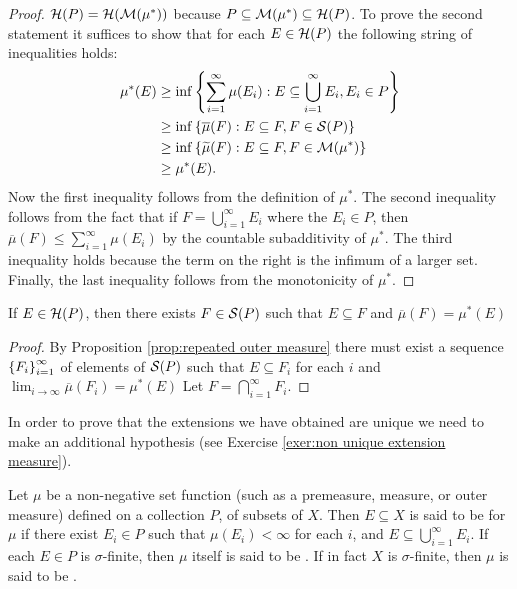 \begin{proof}

${\cal H}(P)={\cal H}({\cal M}(\mu^*))$ because $P \subseteq {\cal M}(\mu^*) \subseteq {\cal H}(P)$. To prove the second statement it suffices to show that for each $E \in {\cal H}(P)$ the following string of inequalities holds:
\begin{align*}
    \mu^*(E) &\geq \inf\left\{\sum_{i=1}^\infty\mu(E_i):E\subseteq \bigcup_{i=1}^\infty E_i, E_i \in P\right\}\\
    &\geq \inf \left\{\overline{\mu}(F):E\subseteq F,F\in {\cal S}(P)\right\}\\
    &\geq \inf \left\{\widetilde{\mu}(F):E\subseteq F,F\in {\cal M}(\mu^*)\right\}\\
    &\geq \mu^*(E).
\end{align*}
Now the first inequality follows from the definition of $\mu^*$. The second inequality follows from the fact that if $F=\bigcup_{i=1}^\infty E_i$ where the $E_i \in P$, then $\overline{\mu}(F) \leq \sum_{i=1}^\infty \mu(E_i)$ by the countable subadditivity of $\mu^*$. The third inequality holds because the term on the right is the infimum of a larger set. Finally, the last inequality follows from the monotonicity of $\mu^*$.
\end{proof}

\begin{corollary}\label{cor:measure of hereditary wrt outer measure}
If $E \in {\cal H}(P)$, then there exists $F \in {\cal S}(P)$ such that $E \subseteq F$ and $\overline{\mu}(F)=\mu^*(E)$
\end{corollary}
\begin{proof}
By Proposition \ref{prop:repeated outer measure} there must exist a sequence $\left\{F_i\right\}_{i=1}^\infty$ of elements of ${\cal S}(P)$ such that $E \subseteq F_i$ for each $i$ and $\lim _{i \to \infty} \overline{\mu}(F_i)=\mu^*(E)$ Let $F=\bigcap_{i=1}^\infty F_i$.
\end{proof}

In order to prove that the extensions we have obtained are unique we need to make an additional hypothesis (see Exercise \ref{exer:non unique extension measure}).

\begin{definition}
Let $\mu$ be a non-negative set function (such as a premeasure, measure, or outer measure) defined on a collection $P$, of subsets of $X$. Then $E \subseteq X$ is said to be  for $\mu$ if there exist $E_i \in P$ such that $\mu(E_i)<\infty$ for each $i$, and $E \subseteq \bigcup_{i=1}^\infty E_i$. If each $E \in P$ is $\sigma$-finite, then $\mu$ itself is said to be . If in fact $X$ is $\sigma$-finite, then $\mu$ is said to be .
\end{definition}

